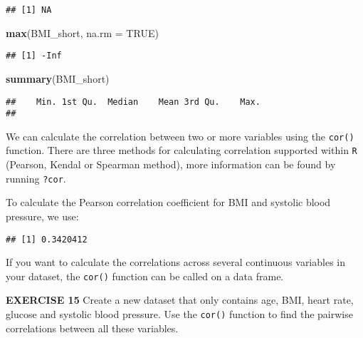 \documentclass[
]{article}
\newenvironment{Shaded}{\begin{snugshade}}{\end{snugshade}}
\newcommand{\DataTypeTok}[1]{\textcolor[rgb]{0.13,0.29,0.53}{#1}}
\newcommand{\KeywordTok}[1]{\textcolor[rgb]{0.13,0.29,0.53}{\textbf{#1}}}
\newcommand{\NormalTok}[1]{#1}
\newcommand{\OperatorTok}[1]{\textcolor[rgb]{0.81,0.36,0.00}{\textbf{#1}}}
\newcommand{\OtherTok}[1]{\textcolor[rgb]{0.56,0.35,0.01}{#1}}
\begin{document}
\begin{verbatim}
## [1] NA
\end{verbatim}

\begin{Shaded}
\begin{Highlighting}[]
\KeywordTok{max}\NormalTok{(BMI_short, }\DataTypeTok{na.rm =} \OtherTok{TRUE}\NormalTok{)}
\end{Highlighting}
\end{Shaded}

\begin{verbatim}
## [1] -Inf
\end{verbatim}

\begin{Shaded}
\begin{Highlighting}[]
\KeywordTok{summary}\NormalTok{(BMI_short)}
\end{Highlighting}
\end{Shaded}

\begin{verbatim}
##    Min. 1st Qu.  Median    Mean 3rd Qu.    Max. 
## 
\end{verbatim}

We can calculate the correlation between two or more variables using the
\texttt{cor()} function. There are three methods for calculating
correlation supported within \texttt{R} (Pearson, Kendal or Spearman
method), more information can be found by running \texttt{?cor}.

To calculate the Pearson correlation coefficient for BMI and systolic
blood pressure, we use:

\begin{Shaded}
\end{Shaded}

\begin{verbatim}
## [1] 0.3420412
\end{verbatim}

If you want to calculate the correlations across several continuous
variables in your dataset, the \texttt{cor()} function can be called on
a data frame.

\textbf{EXERCISE 15} Create a new dataset that only contains age, BMI,
heart rate, glucose and systolic blood pressure. Use the \texttt{cor()}
function to find the pairwise correlations between all these variables.
\end{document}
